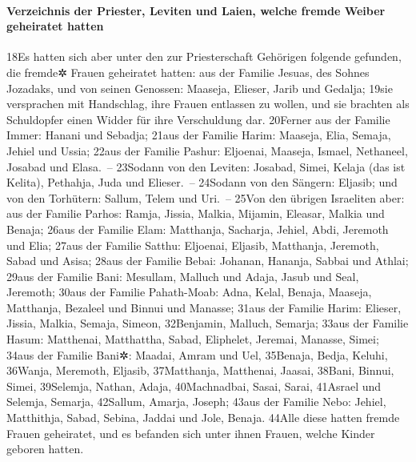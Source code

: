 \hypertarget{verzeichnis-der-priester-leviten-und-laien-welche-fremde-weiber-geheiratet-hatten}{%
\paragraph{Verzeichnis der Priester, Leviten und Laien, welche fremde
Weiber geheiratet
hatten}\label{verzeichnis-der-priester-leviten-und-laien-welche-fremde-weiber-geheiratet-hatten}}

18Es hatten sich aber unter den zur Priesterschaft Gehörigen folgende
gefunden, die fremde✲ Frauen geheiratet hatten: aus der Familie Jesuas,
des Sohnes Jozadaks, und von seinen Genossen: Maaseja, Elieser, Jarib
und Gedalja; 19sie versprachen mit Handschlag, ihre Frauen entlassen zu
wollen, und sie brachten als Schuldopfer einen Widder für ihre
Verschuldung dar. 20Ferner aus der Familie Immer: Hanani und Sebadja;
21aus der Familie Harim: Maaseja, Elia, Semaja, Jehiel und Ussia; 22aus
der Familie Pashur: Eljoenai, Maaseja, Ismael, Nethaneel, Josabad und
Elasa.~-- 23Sodann von den Leviten: Josabad, Simei, Kelaja (das ist
Kelita), Pethahja, Juda und Elieser.~-- 24Sodann von den Sängern:
Eljasib; und von den Torhütern: Sallum, Telem und Uri.~-- 25Von den
übrigen Israeliten aber: aus der Familie Parhos: Ramja, Jissia, Malkia,
Mijamin, Eleasar, Malkia und Benaja; 26aus der Familie Elam: Matthanja,
Sacharja, Jehiel, Abdi, Jeremoth und Elia; 27aus der Familie Satthu:
Eljoenai, Eljasib, Matthanja, Jeremoth, Sabad und Asisa; 28aus der
Familie Bebai: Johanan, Hananja, Sabbai und Athlai; 29aus der Familie
Bani: Mesullam, Malluch und Adaja, Jasub und Seal, Jeremoth; 30aus der
Familie Pahath-Moab: Adna, Kelal, Benaja, Maaseja, Matthanja, Bezaleel
und Binnui und Manasse; 31aus der Familie Harim: Elieser, Jissia,
Malkia, Semaja, Simeon, 32Benjamin, Malluch, Semarja; 33aus der Familie
Hasum: Matthenai, Matthattha, Sabad, Eliphelet, Jeremai, Manasse, Simei;
34aus der Familie Bani✲: Maadai, Amram und Uel, 35Benaja, Bedja, Keluhi,
36Wanja, Meremoth, Eljasib, 37Matthanja, Matthenai, Jaasai, 38Bani,
Binnui, Simei, 39Selemja, Nathan, Adaja, 40Machnadbai, Sasai, Sarai,
41Asrael und Selemja, Semarja, 42Sallum, Amarja, Joseph; 43aus der
Familie Nebo: Jehiel, Matthithja, Sabad, Sebina, Jaddai und Jole,
Benaja. 44Alle diese hatten fremde Frauen geheiratet, und es befanden
sich unter ihnen Frauen, welche Kinder geboren hatten.
